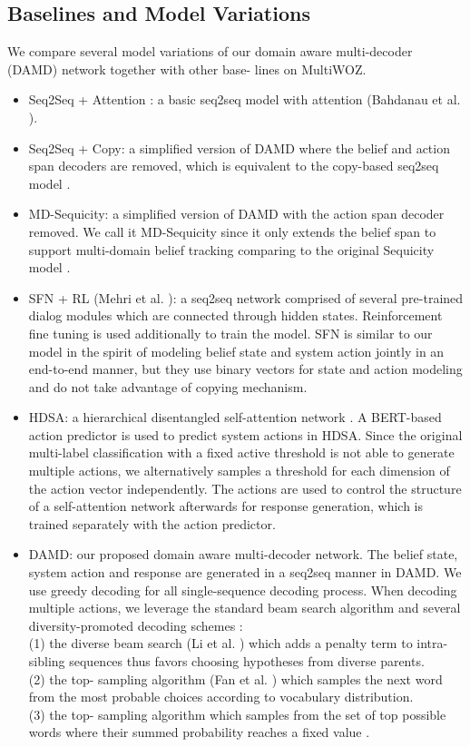 \documentclass[letterpaper]{article} \usepackage{aaai20}  \usepackage{times}  \usepackage{helvet} \usepackage{courier}  \usepackage[hyphens]{url}  \usepackage{graphicx} \urlstyle{rm} \def\UrlFont{\rm}  \usepackage{graphicx}  \frenchspacing  \setlength{\pdfpagewidth}{8.5in}  \setlength{\pdfpageheight}{11in}  \usepackage{multirow}
\begin{document}
	
	\subsection{Baselines and Model Variations}
	We compare several model variations of our domain aware multi-decoder (DAMD) network  together with other base-
	lines on MultiWOZ. 
\begin{itemize}
		\item 
		Seq2Seq + Attention \cite{budzianowski2018multiwoz}: a basic seq2seq model with attention (Bahdanau et al. \citeyear{bahdanau2014neural}).
\item 
		Seq2Seq + Copy: a simplified version of DAMD where the belief and action span decoders are removed, which is equivalent to the copy-based seq2seq model \cite{gu2016incorporating}.
		\item 
		MD-Sequicity: a simplified version of DAMD with the action span decoder removed. We call it MD-Sequicity since it only extends the belief span to support multi-domain belief tracking comparing to the original Sequicity model \cite{lei2018sequicity}.
		\item 
		SFN + RL (Mehri et al. \citeyear{mehri2019structured}): a seq2seq network comprised of several pre-trained dialog modules which are connected through hidden states. Reinforcement fine tuning is used additionally to train the model. SFN is similar to our model in the spirit of modeling belief state and system action jointly in an end-to-end manner, but they use binary vectors for state and action modeling and do not take advantage of copying mechanism.
		\item
		HDSA: a hierarchical disentangled self-attention network \cite{chen2019semantically}. A BERT-based \cite{devlin2018bert} action predictor is used to predict system actions in HDSA. Since the original multi-label classification with a fixed active threshold is not able to generate multiple actions, we alternatively samples a threshold for each dimension of the action vector independently. The actions are used to control the structure of a self-attention network afterwards for response generation, which is trained separately with the action predictor. 
		\item
		DAMD: our proposed domain aware multi-decoder network. The belief state, system action and response are generated in a seq2seq manner in DAMD. We use greedy decoding for all single-sequence decoding process. When decoding multiple actions, we leverage the standard beam search algorithm and several diversity-promoted decoding schemes :  \\
		(1) the diverse beam search (Li et al. \citeyear{li2016simple}) which adds a penalty term to intra-sibling sequences thus favors choosing hypotheses from diverse parents. \\
		(2) the top- sampling algorithm (Fan et al. \citeyear{fan2018hierarchical}) which samples the next word from the  most probable choices according to vocabulary distribution. \\
		(3) the top- sampling algorithm \cite{holtzman2019curious} which samples from the set of top possible words where their summed probability reaches a fixed value .
	\end{itemize}
	
\end{document}
